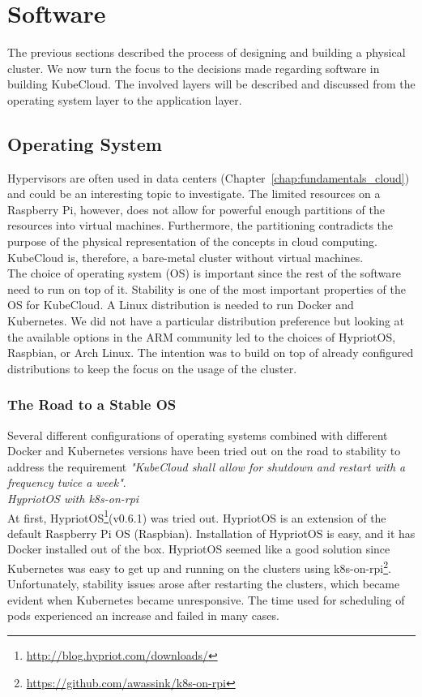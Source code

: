 \section{Software}
The previous sections described the process of designing and building a physical cluster. We now turn the focus to the decisions made regarding software in building KubeCloud. The involved layers will be described and discussed from the operating system layer to the application layer.


\subsection*{Operating System}
Hypervisors are often used in data centers (Chapter~\ref{chap:fundamentals_cloud}) and could be an interesting topic to investigate. The limited resources on a Raspberry Pi, however, does not allow for powerful enough partitions of the resources into virtual machines. Furthermore, the partitioning contradicts the purpose of the physical representation of the concepts in cloud computing. KubeCloud is, therefore, a bare-metal cluster without virtual machines. \\

\noindent
The choice of operating system (OS) is important since the rest of the software need to run on top of it. Stability is one of the most important properties of the OS for KubeCloud.
A Linux distribution is needed to run Docker and Kubernetes. We did not have a particular distribution preference but looking at the available options in the ARM community led to the choices of HypriotOS, Raspbian, or Arch Linux. The intention was to build on top of already configured distributions to keep the focus on the usage of the cluster.

\subsubsection*{The Road to a Stable OS}
Several different configurations of operating systems combined with different Docker and Kubernetes versions have been tried out on the road to stability to address the requirement \textit{"KubeCloud shall allow for shutdown and restart with a frequency twice a week"}. \\

\noindent
\textit{HypriotOS with k8s-on-rpi} \\
At first, HypriotOS\footnote{\url{http://blog.hypriot.com/downloads/}}(v0.6.1) was tried out. HypriotOS is an extension of the default Raspberry Pi OS (Raspbian).  Installation of HypriotOS is easy, and it has Docker installed out of the box. HypriotOS seemed like a good solution since Kubernetes was easy to get up and running on the clusters using k8s-on-rpi\footnote{\url{https://github.com/awassink/k8s-on-rpi}}. Unfortunately, stability issues arose after restarting the clusters, which became evident when Kubernetes became unresponsive. The time used for scheduling of pods experienced an increase and failed in many cases. \\


